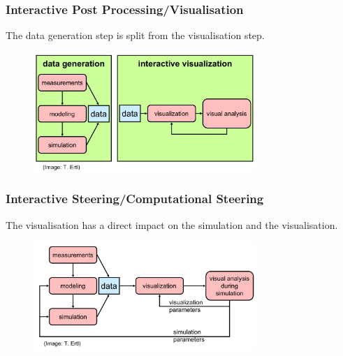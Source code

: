 \subsubsection{Interactive Post Processing/Visualisation}
The data generation step is split from the visualisation step. 
\begin{figure}[H]
    \centering
    \includegraphics[width=0.75\textwidth]{img/01_interactive_post}
\end{figure}
\subsubsection{Interactive Steering/Computational Steering}
The visualisation has a direct impact on the simulation and the visualisation.
\begin{figure}[H]
    \centering
    \includegraphics[width=0.75\textwidth]{img/01_interactive_steering}
\end{figure}

